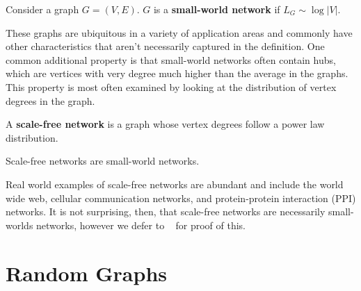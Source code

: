 \begin{definition}
  Consider a graph $G = (V,E)$. $G$ is a \textbf{small-world network} if
  $L_G \sim \log{|V|}$.
\end{definition}

These graphs are ubiquitous in a variety of application areas and commonly have
other characteristics that aren't necessarily captured in the definition. One
common additional property is that small-world networks often contain hubs,
which are vertices with very degree much higher than the average in the graphs.
This property is most often examined by looking at the distribution of vertex
degrees in the graph.





\begin{definition}
  A \textbf{scale-free network} is a graph whose vertex degrees follow a power
  law distribution.
\end{definition}

\begin{theorem}
  Scale-free networks are small-world networks.
\end{theorem}

Real world examples of scale-free networks are abundant and include the world
wide web, cellular communication networks, and protein-protein interaction (PPI)
networks. It is not surprising, then, that scale-free networks are necessarily
small-worlds networks, however we defer to ~\cite{PhysRevLett.90.058701} for
proof of this.


\section{Random Graphs}

